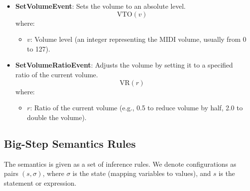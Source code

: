 \documentclass[letterpaper,12pt]{article}
\begin{document}
\begin{itemize}
    \item \textbf{SetVolumeEvent}: Sets the volume to an absolute level.
    \[
    \text{VTO}(v)
    \]
    where:
    \begin{itemize}
        \item \( v \): Volume level (an integer representing the MIDI volume, usually from 0 to 127).
    \end{itemize}

    \item \textbf{SetVolumeRatioEvent}: Adjusts the volume by setting it to a specified ratio of the current volume.
    \[
    \text{VR}(r)
    \]
    where:
    \begin{itemize}
        \item \( r \): Ratio of the current volume (e.g., 0.5 to reduce volume by half, 2.0 to double the volume).
    \end{itemize}
\end{itemize}


\subsection{Big-Step Semantics Rules}

The semantics is given as a set of inference rules. We denote configurations as 
pairs \((s, \sigma)\), where \(\sigma\) is the state (mapping variables to values), and \(s\) is the statement or expression.
\end{document}
